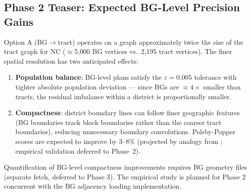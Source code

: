 \subsection{Phase 2 Teaser: Expected BG-Level Precision Gains}

Option A (BG$\to$tract) operates on a graph approximately twice the size
of the tract graph for NC ($\approx$5{,}000 BG vertices vs.\ 2{,}195 tract
vertices).
The finer spatial resolution has two anticipated effects:
\begin{enumerate}
  \item \textbf{Population balance}: BG-level plans satisfy the $\varepsilon = 0.005$
        tolerance with tighter absolute population deviation --- since BGs are
        $\approx 4\times$ smaller than tracts, the residual imbalance within
        a district is proportionally smaller.
  \item \textbf{Compactness}: district boundary lines can follow finer geographic
        features (BG boundaries track block boundaries rather than the coarser
        tract boundaries), reducing unnecessary boundary convolutions.
        Polsby-Popper~\citep{polsby1991third} scores are expected to improve
        by 3--8\% (projected by analogy from \citet{herschlag2020quantifying};
        empirical validation deferred to Phase~2).
\end{enumerate}

Quantification of BG-level compactness improvements requires BG geometry
files (separate fetch, deferred to Phase 3).
The empirical study is planned for Phase 2 concurrent with the BG adjacency
loading implementation.
